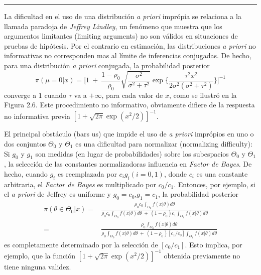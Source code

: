 \documentclass[12pt,]{article}
\begin{document}
\begin{center}\rule{0.5\linewidth}{\linethickness}\end{center}

La dificultad en el uso de una distribución \emph{a priori} imprópia se
relaciona a la llamada paradoja de \emph{Jeffrey Lindley}, un fenómeno
que muestra que los argumentos limitantes (limiting arguments) no son
válidos en situaciones de pruebas de hipótesis. Por el contrario en
estimación, las distribuciones \emph{a priori} no informativas no
corresponden mas al límite de inferencias conjugadas. De hecho, para una
distribución \emph{a priori} conjugada, la probabilidad posterior \[
\pi(\mu=0|x)=\bigg[1\ +\ \frac{1-\rho_0}{\rho_0} \displaystyle \sqrt{\frac{\sigma^2}{\sigma^2+\tau^2}}\exp\bigg\{\frac{\tau^2x^2}{2\sigma^2(\sigma^2+\tau^2)} \bigg\}\bigg]^{-1}
\] converge a \(1\) cuando \(\tau\) va a \(+\infty\), para cada valor de
\(x\), como se ilustró en la Figura 2.6. Este procedimiento no
informativo, obviamente difiere de la respuesta no informativa previa
\([1+\sqrt{2\pi}\exp(x^2/2)]^{-1}\).

El principal obstáculo (bars us) que impide el uso de \emph{a priori}
imprópios en uno o dos conjuntos \(\Theta_0\) y \(\Theta_1\) es una
dificultad para normalizar (normalizing difficulty): Si \(g_0\) y
\(g_1\) son medidas (en lugar de probabilidades) sobre los subespacios
\(\Theta_0\) y \(\Theta_1\), la selección de las constantes
normalizadoras influencia en \emph{Factor de Bayes}. De hecho, cuando
\(g_i\) es reemplazada por \(c_i g_i (i=0,1)\), donde \(c_i\) es una
constante arbitraria, el \emph{Factor de Bayes} es multiplicado por
\(c_0/c_1\). Entonces, por ejemplo, si el \emph{a priori} de Jeffrey es
uniforme y \(g_0=c_0\),\(g_1=c_1\), la probabilidad posterior \[
\begin{array}{rr}
\displaystyle \pi(\theta\in\Theta_0|x)=&\frac{\displaystyle \rho_0c_0\int_{\Theta_0}f(x|\theta)d\theta}{\displaystyle \rho_0c_0\int_{\Theta_0}f(x|\theta)d\theta\ +\ (1-\rho_0)c_1\int_{\Theta_1}f(x|\theta)d\theta}\\
=&\frac{\displaystyle \rho_0\int_{\Theta_0}f(x|\theta)d\theta}{\displaystyle \rho_0\int_{\Theta_0}f(x|\theta)d\theta\ +\ (1-\rho_0)[c_1/c_0]\int_{\Theta_1}f(x|\theta)d\theta}
\end{array}
\] es completamente determinado por la selección de \([c_0/c_1]\). Esto
implica, por ejemplo, que la función \([1+\sqrt{2\pi}\exp(x^2/2)]^{-1}\)
obtenida previamente no tiene ninguna validez.
\end{document}
